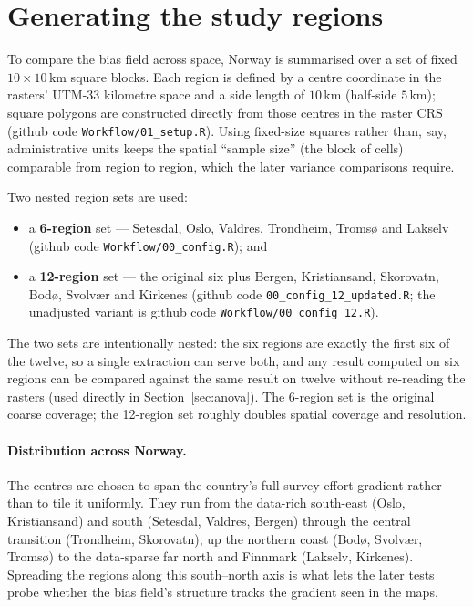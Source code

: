 \section{Generating the study regions}
\label{sec:regions}

To compare the bias field across space, Norway is summarised over a set of
fixed $10\times10$\,km square blocks. Each region is defined by a centre
coordinate in the rasters' UTM-33 kilometre space and a side length of
$10$\,km (half-side $5$\,km); square polygons are constructed directly from
those centres in the raster CRS (github code \texttt{Workflow/01\_setup.R}).
Using fixed-size squares rather than, say, administrative units keeps the
spatial ``sample size'' (the block of cells) comparable from region to
region, which the later variance comparisons require.

Two nested region sets are used:

\begin{itemize}
  \item a \textbf{6-region} set --- Setesdal, Oslo, Valdres, Trondheim,
        Tromsø and Lakselv (github code \texttt{Workflow/00\_config.R});
        and
  \item a \textbf{12-region} set --- the original six plus Bergen,
        Kristiansand, Skorovatn, Bodø, Svolvær and Kirkenes (github code
        \texttt{00\_config\_12\_updated.R}; the unadjusted variant is
        github code \texttt{Workflow/00\_config\_12.R}).
\end{itemize}

\noindent
The two sets are intentionally nested: the six regions are exactly the
first six of the twelve, so a single extraction can serve both, and any
result computed on six regions can be compared against the same result on
twelve without re-reading the rasters (used directly in
Section~\ref{sec:anova}). The 6-region set is the original coarse coverage;
the 12-region set roughly doubles spatial coverage and resolution.

\paragraph{Distribution across Norway.}
The centres are chosen to span the country's full survey-effort gradient
rather than to tile it uniformly. They run from the data-rich south-east
(Oslo, Kristiansand) and south (Setesdal, Valdres, Bergen) through the
central transition (Trondheim, Skorovatn), up the northern coast (Bodø,
Svolvær, Tromsø) to the data-sparse far north and Finnmark (Lakselv,
Kirkenes). Spreading the regions along this south--north axis is what lets
the later tests probe whether the bias field's structure tracks the
gradient seen in the maps.

